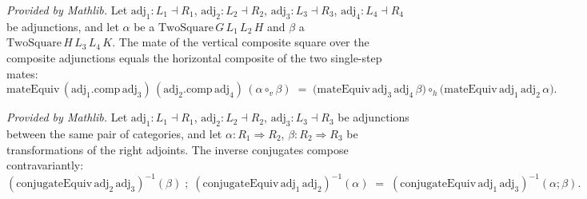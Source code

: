 \begin{lemma}
  \label{lem:mateEquiv_hcomp_mathlib}
  \mathlibok
  \textit{Provided by Mathlib.}
  Let \(\mathrm{adj}_1 : L_1 \dashv R_1\), \(\mathrm{adj}_2 : L_2 \dashv R_2\),
  \(\mathrm{adj}_3 : L_3 \dashv R_3\), \(\mathrm{adj}_4 : L_4 \dashv R_4\) be adjunctions, and
  let \(\alpha\) be a \(\mathrm{TwoSquare}\,G\,L_1\,L_2\,H\) and \(\beta\) a
  \(\mathrm{TwoSquare}\,H\,L_3\,L_4\,K\). The mate of the vertical composite square over the
  composite adjunctions equals the horizontal composite of the two single-step mates:
  \[
    \mathrm{mateEquiv}\,(\mathrm{adj}_1.\mathrm{comp}\,\mathrm{adj}_3)\,
      (\mathrm{adj}_2.\mathrm{comp}\,\mathrm{adj}_4)\,(\alpha \mathbin{\circ_v} \beta)
      \;=\;
    \bigl(\mathrm{mateEquiv}\,\mathrm{adj}_3\,\mathrm{adj}_4\,\beta\bigr)
      \mathbin{\circ_h}
    \bigl(\mathrm{mateEquiv}\,\mathrm{adj}_1\,\mathrm{adj}_2\,\alpha\bigr).
  \]
\end{lemma}

\begin{lemma}
  \label{lem:conjugateEquiv_symm_comp_mathlib}
  \mathlibok
  \textit{Provided by Mathlib.}
  Let \(\mathrm{adj}_1 : L_1 \dashv R_1\), \(\mathrm{adj}_2 : L_2 \dashv R_2\),
  \(\mathrm{adj}_3 : L_3 \dashv R_3\) be adjunctions between the same pair of categories, and
  let \(\alpha : R_1 \Rightarrow R_2\), \(\beta : R_2 \Rightarrow R_3\) be transformations of
  the right adjoints. The inverse conjugates compose contravariantly:
  \[
    (\mathrm{conjugateEquiv}\,\mathrm{adj}_2\,\mathrm{adj}_3)^{-1}(\beta)
      \;\mathbin{;}\;
    (\mathrm{conjugateEquiv}\,\mathrm{adj}_1\,\mathrm{adj}_2)^{-1}(\alpha)
      \;=\;
    (\mathrm{conjugateEquiv}\,\mathrm{adj}_1\,\mathrm{adj}_3)^{-1}(\alpha \mathbin{;} \beta).
  \]
\end{lemma}

